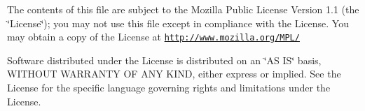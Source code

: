 The contents of this file are subject to the Mozilla Public License Version 1.1 (the \char`\"{}License\char`\"{}); you may not use this file except in compliance with the License. You may obtain a copy of the License at \href{http://www.mozilla.org/MPL/}{\tt http://www.mozilla.org/MPL/}

Software distributed under the License is distributed on an \char`\"{}AS IS\char`\"{} basis, WITHOUT WARRANTY OF ANY KIND, either express or implied. See the License for the specific language governing rights and limitations under the License. 